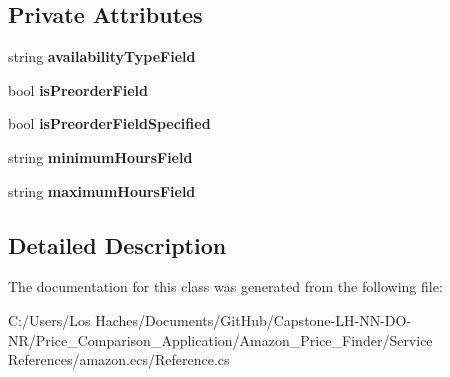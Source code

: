 \subsection*{Private Attributes}
\begin{DoxyCompactItemize}
\item 
\hypertarget{class_price___comparison_1_1amazon_1_1ecs_1_1_offer_listing_availability_attributes_a5a0b279e27a43eb0ed016495ce11d469}{string {\bfseries availability\-Type\-Field}}\label{class_price___comparison_1_1amazon_1_1ecs_1_1_offer_listing_availability_attributes_a5a0b279e27a43eb0ed016495ce11d469}

\item 
\hypertarget{class_price___comparison_1_1amazon_1_1ecs_1_1_offer_listing_availability_attributes_ad2fbe8e5bc62173e1b3dba661d6a425d}{bool {\bfseries is\-Preorder\-Field}}\label{class_price___comparison_1_1amazon_1_1ecs_1_1_offer_listing_availability_attributes_ad2fbe8e5bc62173e1b3dba661d6a425d}

\item 
\hypertarget{class_price___comparison_1_1amazon_1_1ecs_1_1_offer_listing_availability_attributes_ae7cd7f55cad05c63219fde03e1d865bb}{bool {\bfseries is\-Preorder\-Field\-Specified}}\label{class_price___comparison_1_1amazon_1_1ecs_1_1_offer_listing_availability_attributes_ae7cd7f55cad05c63219fde03e1d865bb}

\item 
\hypertarget{class_price___comparison_1_1amazon_1_1ecs_1_1_offer_listing_availability_attributes_a9b6d43ae5d3b3453fbb3318bd649c30a}{string {\bfseries minimum\-Hours\-Field}}\label{class_price___comparison_1_1amazon_1_1ecs_1_1_offer_listing_availability_attributes_a9b6d43ae5d3b3453fbb3318bd649c30a}

\item 
\hypertarget{class_price___comparison_1_1amazon_1_1ecs_1_1_offer_listing_availability_attributes_a90a4a9d7c12dd9173984ff55c058c1f2}{string {\bfseries maximum\-Hours\-Field}}\label{class_price___comparison_1_1amazon_1_1ecs_1_1_offer_listing_availability_attributes_a90a4a9d7c12dd9173984ff55c058c1f2}

\end{DoxyCompactItemize}


\subsection{Detailed Description}


The documentation for this class was generated from the following file\-:\begin{DoxyCompactItemize}
\item 
C\-:/\-Users/\-Los Haches/\-Documents/\-Git\-Hub/\-Capstone-\/\-L\-H-\/\-N\-N-\/\-D\-O-\/\-N\-R/\-Price\-\_\-\-Comparison\-\_\-\-Application/\-Amazon\-\_\-\-Price\-\_\-\-Finder/\-Service References/amazon.\-ecs/Reference.\-cs\end{DoxyCompactItemize}
